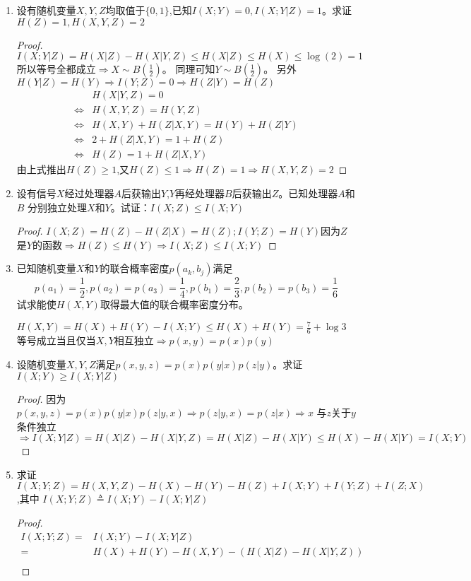 \documentclass[a4paper]{article}
\begin{document}
\begin{enumerate}
\begin{solution}
\end{solution}
\item 设有随机变量$X,Y,Z$均取值于$\{0,1\}$,已知$I(X;Y)=0,I(X;Y|Z)=1$。求证$H(Z)=1,H(X,Y,Z)=2$
\begin{proof}
$I(X;Y|Z)=H(X|Z)-H(X|Y,Z)\leq H(X|Z)\leq H(X)\leq \log(2)=1$
所以等号全都成立$\Rightarrow X\sim B(\frac{1}{2})$。
同理可知$Y\sim B(\frac{1}{2})$。
另外$H(Y|Z)=H(Y)\Rightarrow I(Y;Z)=0\Rightarrow H(Z|Y)=H(Z)$
\begin{align*}
&H(X|Y,Z)=0 \\
\iff &H(X,Y,Z)=H(Y,Z)\\
\iff &H(X,Y)+H(Z|X,Y)=H(Y)+H(Z|Y)\\
\iff &2+H(Z|X,Y)=1+H(Z)\\
\iff &H(Z)=1+H(Z|X,Y)
\end{align*}
由上式推出$H(Z)\geq 1$,又$H(Z)\leq 1\Rightarrow H(Z)=1\Rightarrow H(X,Y,Z)=2$
\end{proof}
\item
设有信号$X$经过处理器$A$后获输出$Y$,$Y$再经处理器$B$后获输出$Z$。已知处理器$A$和$B$
分别独立处理$X$和$Y$。试证：$I(X;Z)\leq I(X;Y)$
\begin{proof}
$I(X;Z)=H(Z)-H(Z|X)=H(Z);I(Y;Z)=H(Y)$因为$Z$是$Y$的函数$\Rightarrow H(Z)\leq H(Y) \Rightarrow I(X;Z)\leq I(X;Y)$
\end{proof}
\item 已知随机变量$X$和$Y$的联合概率密度$p(a_k,b_j)$满足
$$
p(a_1)=\frac{1}{2},p(a_2)=p(a_3)=\frac{1}{4},p(b_1)=\frac{2}{3},p(b_2)=p(b_3)=\frac{1}{6}
$$
试求能使$H(X,Y)$取得最大值的联合概率密度分布。
\begin{solution}
$H(X,Y)=H(X)+H(Y)-I(X;Y)\leq H(X)+H(Y)=\frac{7}{6}+\log 3$
等号成立当且仅当$X,Y$相互独立$\Rightarrow p(x,y)=p(x)p(y)$
\end{solution}
\item 设随机变量$X,Y,Z$满足$p(x,y,z)=p(x)p(y|x)p(z|y)$。求证$I(X;Y)\geq I(X;Y|Z)$
\begin{proof}
因为$p(x,y,z)=p(x)p(y|x)p(z|y,x)\Rightarrow p(z|y,x)=p(z|x)\Rightarrow x$ 与$z$关于$y$条件独立$\Rightarrow I(X;Y|Z)=H(X|Z)-H(X|Y,Z)= H(X|Z)-H(X|Y)\leq H(X)-H(X|Y) =I(X;Y)$
\end{proof}
\item 求证$I(X;Y;Z)=H(X,Y,Z)-H(X)-H(Y)-H(Z)+I(X;Y)+I(Y;Z)+I(Z;X)$,其中
$I(X;Y;Z)\triangleq I(X;Y)-I(X;Y|Z)$
\begin{proof}
\begin{align*}
I(X;Y;Z) =& I(X;Y)-I(X;Y|Z) \\
=& H(X)+H(Y)-H(X,Y)-(H(X|Z)-H(X|Y,Z))\\

\end{align*}
\end{proof}
\end{enumerate}
\end{document}
